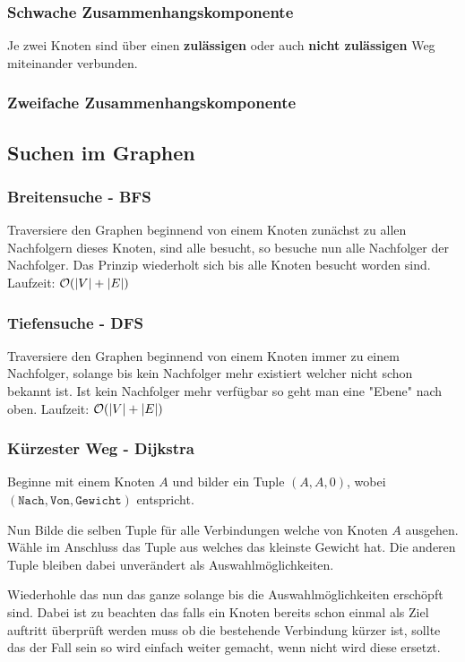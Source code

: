 \documentclass[10pt,a4paper]{article}
\begin{document}
\begin{multicols*}{4}
\subsubsection*{Schwache Zusammenhangskomponente}
Je zwei Knoten sind über einen \textbf{zulässigen} oder auch \textbf{nicht zulässigen} Weg miteinander verbunden.

\subsubsection*{Zweifache Zusammenhangskomponente}

\subsection{Suchen im Graphen}

\subsubsection*{Breitensuche - BFS}
Traversiere den Graphen beginnend von einem Knoten zunächst zu allen Nachfolgern dieses Knoten, sind alle besucht, so
besuche nun alle Nachfolger der Nachfolger. Das Prinzip wiederholt sich bis alle Knoten besucht worden sind.
Laufzeit: \(\mathcal{O}(\lvert V\rvert+\lvert E\rvert)\)

\subsubsection*{Tiefensuche - DFS}
Traversiere den Graphen beginnend von einem Knoten immer zu einem Nachfolger, solange bis kein Nachfolger mehr existiert
welcher nicht schon bekannt ist. Ist kein Nachfolger mehr verfügbar so geht man eine "Ebene" nach oben.
Laufzeit: \(\mathcal{O}(\lvert V\rvert+\lvert E\rvert)\)

\subsubsection*{Kürzester Weg - Dijkstra}
Beginne mit einem Knoten \(A\) und bilder ein Tuple \((A,A,0)\), wobei \((\texttt{Nach},\texttt{Von},\texttt{Gewicht})\)
entspricht.

Nun Bilde die selben Tuple für alle Verbindungen welche von Knoten \(A\) ausgehen. Wähle im Anschluss das Tuple aus
welches das kleinste Gewicht hat. Die anderen Tuple bleiben dabei unverändert als Auswahlmöglichkeiten.

Wiederhohle das nun das ganze solange bis die Auswahlmöglichkeiten erschöpft sind. Dabei ist zu beachten das falls ein
Knoten bereits schon einmal als Ziel auftritt überprüft werden muss ob die bestehende Verbindung kürzer ist, sollte das
der Fall sein so wird einfach weiter gemacht, wenn nicht wird diese ersetzt.


\end{multicols*}
\end{document}

